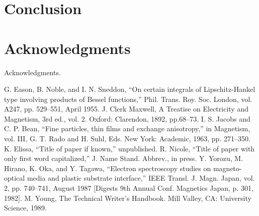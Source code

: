 \documentclass[conference]{../styles/IEEEtran}
\begin{document}
    \section{Conclusion}



    \section*{Acknowledgments}

    Acknowledgments.



    \begin{thebibliography}{00}
         G. Eason, B. Noble, and I. N. Sneddon, ``On certain integrals of Lipschitz-Hankel type involving products of Bessel functions,'' Phil. Trans. Roy. Soc. London, vol. A247, pp. 529--551, April 1955.
         J. Clerk Maxwell, A Treatise on Electricity and Magnetism, 3rd ed., vol. 2. Oxford: Clarendon, 1892, pp.68--73.
         I. S. Jacobs and C. P. Bean, ``Fine particles, thin films and exchange anisotropy,'' in Magnetism, vol. III, G. T. Rado and H. Suhl, Eds. New York: Academic, 1963, pp. 271--350.
         K. Elissa, ``Title of paper if known,'' unpublished.
         R. Nicole, ``Title of paper with only first word capitalized,'' J. Name Stand. Abbrev., in press.
         Y. Yorozu, M. Hirano, K. Oka, and Y. Tagawa, ``Electron spectroscopy studies on magneto-optical media and plastic substrate interface,'' IEEE Transl. J. Magn. Japan, vol. 2, pp. 740--741, August 1987 [Digests 9th Annual Conf. Magnetics Japan, p. 301, 1982].
         M. Young, The Technical Writer's Handbook. Mill Valley, CA: University Science, 1989.
    \end{thebibliography}
\end{document}
